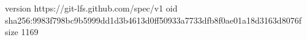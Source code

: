 version https://git-lfs.github.com/spec/v1
oid sha256:9983f798bc9b5999dd1d3b4613d0ff50933a7733dfb8f0ae01a18d3163d8076f
size 1169
